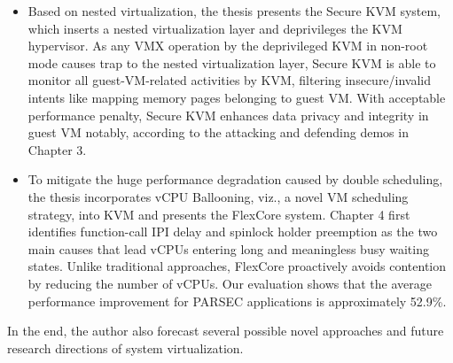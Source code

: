 \begin{englishabstract}
\begin{itemize}
\item Based on nested virtualization, the thesis presents the Secure KVM system, which inserts a nested virtualization layer and deprivileges the KVM hypervisor. As any VMX operation by the deprivileged KVM in non-root mode causes trap to the nested virtualization layer, Secure KVM is able to monitor all guest-VM-related activities by KVM, filtering insecure/invalid intents like mapping memory pages belonging to guest VM. With acceptable performance penalty, Secure KVM enhances data privacy and integrity in guest VM notably, according to the attacking and defending demos in Chapter 3.
\item To mitigate the huge performance degradation caused by double scheduling, the thesis incorporates vCPU Ballooning, viz., a novel VM scheduling strategy, into KVM and presents the FlexCore system. Chapter 4 first identifies function-call IPI delay and spinlock holder preemption as the two main causes that lead vCPUs entering long and meaningless busy waiting states. Unlike traditional approaches, FlexCore proactively avoids contention by reducing the number of vCPUs. Our evaluation shows that the average performance improvement for PARSEC applications is approximately 52.9\%.
\end{itemize}

In the end, the author also forecast several possible novel approaches and future research directions of system virtualization.


\end{englishabstract}
